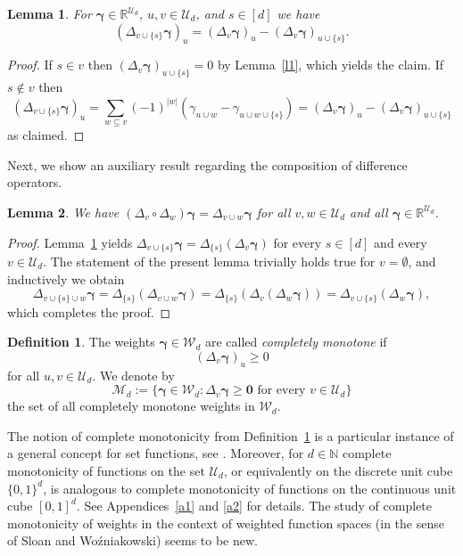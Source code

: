 \documentclass{article}
\newcommand{\R}  {{\mathbb R}}
\newcommand{\N}  {{\mathbb N}}
\newcommand{\bg}{{\boldsymbol{\gamma}}}
\newcommand{\bn}{{\boldsymbol{0}}}
\newcommand{\U}  {\mathcal{U}}
\newcommand{\W}  {\mathcal{W}}
\newcommand{\M}  {\mathcal{M}}
\theoremstyle{plain}
\newtheorem{lemma}{Lemma}
\theoremstyle{definition}
\newtheorem{defi}{Definition}
\begin{document}
\begin{lemma}\label{l2}
For $\bg \in \R^{\U_d}$, $u,v \in \U_d$, and $s \in [d]$ we have
\[
\left(\Delta_{v \cup \{s\}} \bg\right)_u = 
\left(\Delta_v \bg\right)_u  - 
\left(\Delta_v \bg\right)_{u \cup \{s\}}.
\]
\end{lemma}

\begin{proof}
If $s \in v$ then
$\left(\Delta_v \bg\right)_{u \cup \{s\}} = 0$ by Lemma~\ref{l1},
which yields the claim. If $s \not\in v$ then
\[
\left( \Delta_{v \cup \{s\}} \bg\right)_u =
\sum_{w \subseteq v} (-1)^{|w|} 
\left( \gamma_{u \cup w} - \gamma_{u \cup w \cup \{s\}} 
\right)
=
\left( \Delta_v \bg\right)_u - 
\left( \Delta_v \bg\right)_{u\cup \{s\}}
\]
as claimed.
\end{proof}

Next, we show an auxiliary result regarding the composition 
of difference operators.


\begin{lemma}\label{l2a}
We have $(\Delta_v \circ \Delta_w) \bg = \Delta_{v \cup w} \bg$
for all $v,w\in \U_d$ and all $\bg \in \R^{\U_d}$.
\end{lemma}

\begin{proof}
Lemma~\ref{l2} yields 
$\Delta_{v \cup \{s\}} \bg = \Delta_{\{s\}} ( \Delta_v \bg)$
for every $s \in [d]$ and every $v\in \U_d$. 
The statement of the present lemma trivially
holds true for $v = \emptyset$, and inductively we obtain
\[
\Delta_{v \cup \{s\} \cup w} \bg =
\Delta_{\{s\}} (\Delta_{v \cup w} \bg) =
\Delta_{\{s\}} (\Delta_v (\Delta_w \bg)) =
\Delta_{v \cup \{s\}} (\Delta_w \bg),
\]
which completes the proof.
\end{proof}


\begin{defi}\label{def:comp_mon_dec}
The weights $\bg \in \W_d$ are called 
\emph{completely monotone} 
if
\[
\left(\Delta_v \bg \right)_u \ge 0
\] 
for all $u,v\in \U_d$. We denote by 
\[
\M_d := \{ \bg \in \W_d : 
\text{$\Delta_v \bg \geq \bn$ for every $v \in \U_d$}\}
\]
the set of all completely monotone weights in $\W_d$.
\end{defi}

The notion of complete monotonicity from 
Definition~\ref{def:comp_mon_dec} is a particular instance of a 
general concept 
for set functions,  see \citet{Kurtz74}.
Moreover, for $d \in \N$ complete monotonicity of  
functions on the set $\U_d$, or equivalently on the discrete unit
cube $\{0,1\}^d$, is analogous
to complete monotonicity of functions on the continuous
unit cube $[0,1]^d$. See Appendices~\ref{a1} and \ref{a2}
for details.
The study of complete monotonicity of weights in the context 
of weighted function spaces (in the sense of Sloan and
Wo\'zniakowski) seems to be new.
\end{document}
